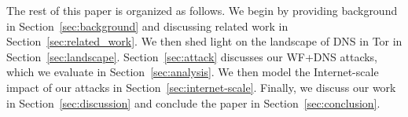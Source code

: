 The rest of this paper is organized as follows.  We begin by providing
background in Section~\ref{sec:background} and discussing related
work in Section~\ref{sec:related_work}.  We then shed light on the landscape of DNS in Tor
in Section~\ref{sec:landscape}.  Section~\ref{sec:attack} discusses our WF+DNS
attacks, which we evaluate in Section~\ref{sec:analysis}.  We
then model the Internet-scale impact of our attacks in
Section~\ref{sec:internet-scale}.  Finally, we discuss our work in
Section~\ref{sec:discussion} and conclude the paper in
Section~\ref{sec:conclusion}.
